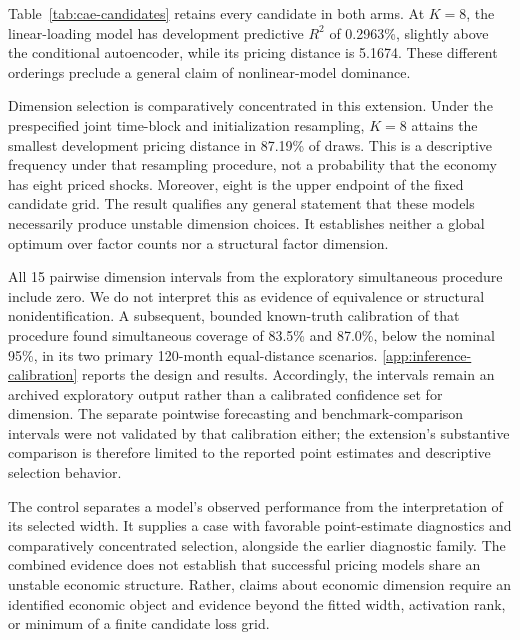 Table~\ref{tab:cae-candidates} retains every candidate in both arms. At $K=8$, the linear-loading model has development predictive $R^2$ of 0.2963\%, slightly above the conditional autoencoder, while its pricing distance is 5.1674. These different orderings preclude a general claim of nonlinear-model dominance.



Dimension selection is comparatively concentrated in this extension. Under the
prespecified joint time-block and initialization resampling, $K=8$ attains the
smallest development pricing distance in 87.19\% of draws. This is a descriptive
frequency under that resampling procedure, not a probability that the economy
has eight priced shocks. Moreover, eight is the upper endpoint of the fixed
candidate grid. The result qualifies any general statement that these models
necessarily produce unstable dimension choices. It establishes neither a global
optimum over factor counts nor a structural factor dimension.

All 15 pairwise dimension intervals from the exploratory simultaneous procedure
include zero. We do not interpret this as evidence of equivalence or structural
nonidentification. A subsequent, bounded known-truth calibration of that procedure
found simultaneous coverage of 83.5\% and 87.0\%, below the nominal 95\%, in its two
primary 120-month equal-distance scenarios. \ref{app:inference-calibration}
reports the design and results. Accordingly, the intervals remain an archived
exploratory output rather than a calibrated confidence set for dimension.
The separate pointwise forecasting and benchmark-comparison intervals were not
validated by that calibration either; the extension's substantive comparison is
therefore limited to the reported point estimates and descriptive selection
behavior.

The control separates a model's observed performance from the interpretation of
its selected width. It supplies a case with favorable point-estimate diagnostics
and comparatively concentrated selection, alongside the earlier diagnostic
family. The combined evidence does not establish that successful pricing models
share an unstable economic structure. Rather, claims about economic dimension
require an identified economic object and evidence beyond the fitted width,
activation rank, or minimum of a finite candidate loss grid.

